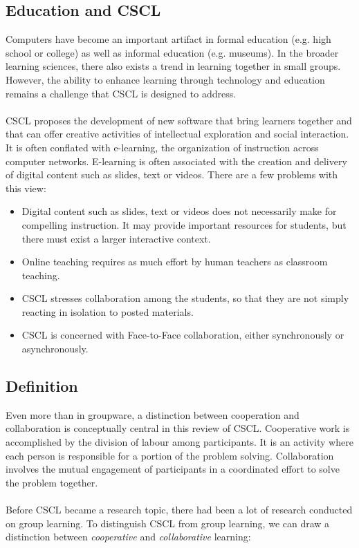 \subsection{Education and CSCL}

Computers have become an important artifact in formal education (e.g. high school or college) as well as informal education (e.g. museums). In the broader learning sciences, there also exists a trend in learning together in small groups. However, the ability to enhance learning through technology and education remains a challenge that CSCL is designed to address. 
\\ \\
CSCL proposes the development of new software that bring learners together and that can offer creative activities of intellectual exploration and social interaction. It is often conflated with e-learning, the organization of instruction across computer networks. E-learning is often associated with the creation and delivery of digital content such as slides, text or videos. There are a few problems with this view:

\begin{itemize}
\item{Digital content such as slides, text or videos does not necessarily make for compelling instruction. It may provide important resources for students, but there must exist a larger interactive context.}
\item{Online teaching requires as much effort by human teachers as classroom teaching.}
\item{CSCL stresses collaboration among the students, so that they are not simply reacting in isolation to posted materials.}
\item{CSCL is concerned with Face-to-Face collaboration, either synchronously or asynchronously.}
\end{itemize}

\subsection{Definition}

Even more than in groupware, a distinction between cooperation and collaboration is conceptually central in this review of CSCL. Cooperative work is accomplished by the division of labour among participants. It is an activity where each person is responsible for a portion of the problem solving. Collaboration involves the mutual engagement of participants in a coordinated effort to solve the problem together.
\\ \\
Before CSCL became a research topic, there had been a lot of research conducted on group learning. To distinguish CSCL from group learning, we can draw a distinction between \textit{cooperative} and \textit{collaborative} learning:


